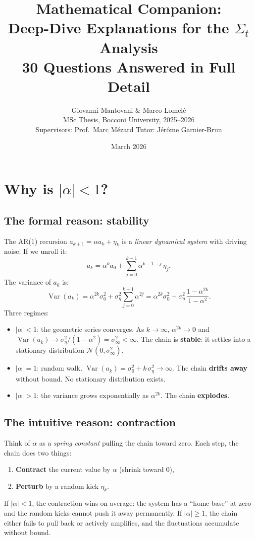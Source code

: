 \documentclass[11pt,a4paper]{article}
\title{\bfseries Mathematical Companion:\\[4pt]
Deep-Dive Explanations for the $\Sigma_t$ Analysis\\[6pt]
\large 30 Questions Answered in Full Detail}
\author{Giovanni Mantovani \& Marco Lomel\'e\\[2pt]
\small MSc Thesis, Bocconi University, 2025--2026\\
\small Supervisors: Prof.\ Marc M\'ezard \quad Tutor: J\'er\^ome Garnier-Brun}
\date{March 2026}
\newcommand{\Var}{\operatorname{Var}}
\newcommand{\sigeta}{\sigma_\eta^2}
\newcommand{\sigzero}{\sigma_0^2}
\newcommand{\siginf}{\sigma_\infty^2}
\begin{document}
\maketitle
\tableofcontents
\newpage

\section{Why is $|\alpha| < 1$?}
\label{sec:q1}

\subsection{The formal reason: stability}

The AR(1) recursion $a_{k+1} = \alpha a_k + \eta_k$ is a \emph{linear dynamical system} with driving noise.  If we unroll it:
\begin{equation}\label{eq:unroll}
  a_k = \alpha^k a_0 + \sum_{j=0}^{k-1} \alpha^{k-1-j}\,\eta_j.
\end{equation}
The variance of $a_k$ is:
\begin{equation}
  \Var(a_k) = \alpha^{2k}\sigzero + \sigeta \sum_{j=0}^{k-1}\alpha^{2j} = \alpha^{2k}\sigzero + \sigeta\,\frac{1 - \alpha^{2k}}{1 - \alpha^2}.
\end{equation}
Three regimes:
\begin{itemize}[nosep]
  \item $|\alpha| < 1$: the geometric series converges.  As $k \to \infty$, $\alpha^{2k} \to 0$ and $\Var(a_k) \to \sigeta/(1-\alpha^2) = \siginf < \infty$.  The chain is \textbf{stable}: it settles into a stationary distribution $\mathcal{N}(0, \siginf)$.
  \item $|\alpha| = 1$: random walk.  $\Var(a_k) = \sigzero + k\,\sigeta \to \infty$.  The chain \textbf{drifts away} without bound.  No stationary distribution exists.
  \item $|\alpha| > 1$: the variance grows exponentially as $\alpha^{2k}$.  The chain \textbf{explodes}.
\end{itemize}

\subsection{The intuitive reason: contraction}

Think of $\alpha$ as a \emph{spring constant} pulling the chain toward zero.  Each step, the chain does two things:
\begin{enumerate}[nosep]
  \item \textbf{Contract} the current value by $\alpha$ (shrink toward 0),
  \item \textbf{Perturb} by a random kick $\eta_k$.
\end{enumerate}
If $|\alpha| < 1$, the contraction wins on average: the system has a ``home base'' at zero and the random kicks cannot push it away permanently.  If $|\alpha| \geq 1$, the chain either fails to pull back or actively amplifies, and the fluctuations accumulate without bound.
\end{document}
